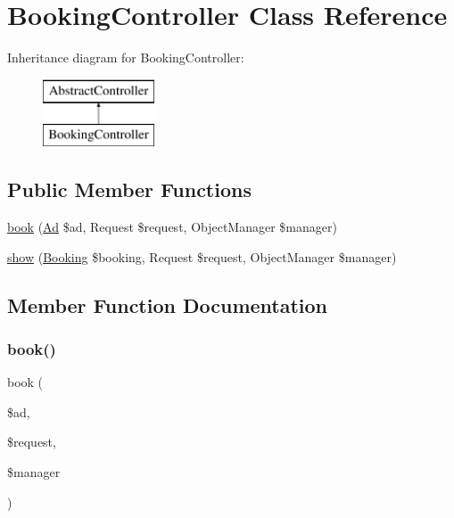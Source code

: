 \hypertarget{class_app_1_1_controller_1_1_booking_controller}{}\section{Booking\+Controller Class Reference}
\label{class_app_1_1_controller_1_1_booking_controller}
Inheritance diagram for Booking\+Controller\+:\begin{figure}[H]
\begin{center}
\leavevmode
\includegraphics[height=2.000000cm]{class_app_1_1_controller_1_1_booking_controller}
\end{center}
\end{figure}
\subsection*{Public Member Functions}
\begin{DoxyCompactItemize}
\item 
\mbox{\hyperlink{class_app_1_1_controller_1_1_booking_controller_a98045dfae4fc7becca09bb478cd40476}{book}} (\mbox{\hyperlink{class_app_1_1_entity_1_1_ad}{Ad}} \$ad, Request \$request, Object\+Manager \$manager)
\item 
\mbox{\hyperlink{class_app_1_1_controller_1_1_booking_controller_a897cc5638a1c995dadacbcc507c1ee63}{show}} (\mbox{\hyperlink{class_app_1_1_entity_1_1_booking}{Booking}} \$booking, Request \$request, Object\+Manager \$manager)
\end{DoxyCompactItemize}


\subsection{Member Function Documentation}
\mbox{\label{class_app_1_1_controller_1_1_booking_controller_a98045dfae4fc7becca09bb478cd40476}} 
\subsubsection{\texorpdfstring{book()}{book()}}
{\footnotesize\ttfamily book (\begin{DoxyParamCaption}\item[{\mbox{\hyperlink{class_app_1_1_entity_1_1_ad}{Ad}}}]{\$ad,  }\item[{Request}]{\$request,  }\item[{Object\+Manager}]{\$manager }\end{DoxyParamCaption})}

